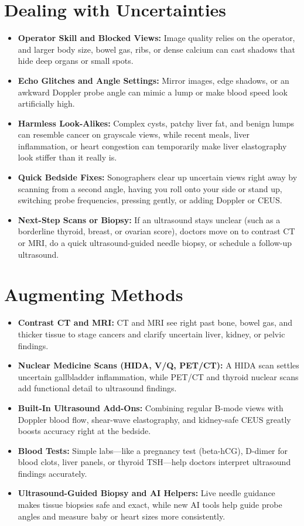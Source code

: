 \section{Dealing with Uncertainties}
\begin{itemize}
  \item \textbf{Operator Skill and Blocked Views:} Image quality relies on the operator, and larger body size, bowel gas, ribs, or dense calcium can cast shadows that hide deep organs or small spots.
  \item \textbf{Echo Glitches and Angle Settings:} Mirror images, edge shadows, or an awkward Doppler probe angle can mimic a lump or make blood speed look artificially high.
  \item \textbf{Harmless Look-Alikes:} Complex cysts, patchy liver fat, and benign lumps can resemble cancer on grayscale views, while recent meals, liver inflammation, or heart congestion can temporarily make liver elastography look stiffer than it really is.
  \item \textbf{Quick Bedside Fixes:} Sonographers clear up uncertain views right away by scanning from a second angle, having you roll onto your side or stand up, switching probe frequencies, pressing gently, or adding Doppler or CEUS.
  \item \textbf{Next-Step Scans or Biopsy:} If an ultrasound stays unclear (such as a borderline thyroid, breast, or ovarian score), doctors move on to contrast CT or MRI, do a quick ultrasound-guided needle biopsy, or schedule a follow-up ultrasound.
\end{itemize}

\section{Augmenting Methods}
\begin{itemize}
  \item \textbf{Contrast CT and MRI:} CT and MRI see right past bone, bowel gas, and thicker tissue to stage cancers and clarify uncertain liver, kidney, or pelvic findings.
  \item \textbf{Nuclear Medicine Scans (HIDA, V/Q, PET/CT):} A HIDA scan settles uncertain gallbladder inflammation, while PET/CT and thyroid nuclear scans add functional detail to ultrasound findings.
  \item \textbf{Built-In Ultrasound Add-Ons:} Combining regular B-mode views with Doppler blood flow, shear-wave elastography, and kidney-safe CEUS greatly boosts accuracy right at the bedside.
  \item \textbf{Blood Tests:} Simple labs---like a pregnancy test (beta-hCG), D-dimer for blood clots, liver panels, or thyroid TSH---help doctors interpret ultrasound findings accurately.
  \item \textbf{Ultrasound-Guided Biopsy and AI Helpers:} Live needle guidance makes tissue biopsies safe and exact, while new AI tools help guide probe angles and measure baby or heart sizes more consistently.
\end{itemize}

